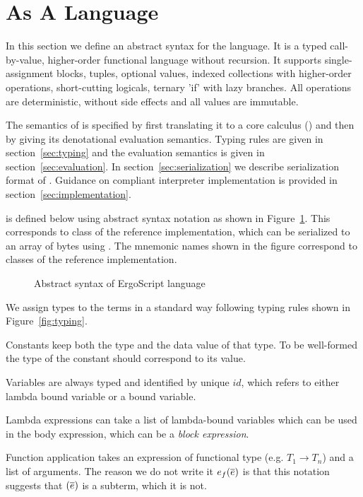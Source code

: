 \section{\langname As A Language}
\label{sec:language}

In this section we define an abstract syntax for the \langname language. It is a typed
call-by-value, higher-order functional language without recursion. It supports
single-assignment blocks, tuples, optional values, indexed collections with
higher-order operations, short-cutting logicals, ternary 'if' with lazy branches. All
operations are deterministic, without side effects and all values are immutable.

The semantics of \langname is specified by first translating it to a core calculus
(\corelang) and then by giving its denotational evaluation semantics. Typing rules are
given in section~\ref{sec:typing} and the evaluation semantics is given in
section~\ref{sec:evaluation}. In section~\ref{sec:serialization} we describe serialization format of
\langname. Guidance on compliant interpreter implementation is provided in
section~\ref{sec:implementation}.

\langname is defined below using abstract syntax notation as shown in
Figure~\ref{fig:language}. This corresponds to  class of the reference
implementation, which can be serialized to an array of bytes using
. The mnemonic names shown in the figure correspond to classes of
the reference implementation.

\begin{figure}[h]
    \footnotesize
    
    \caption{Abstract syntax of ErgoScript language}
    \label{fig:language}
\end{figure}
    
We assign types to the terms in a standard way following typing rules shown
in Figure~\ref{fig:typing}.

Constants keep both the type and the data value of that type. To be
well-formed the type of the constant should correspond to its value.

Variables are always typed and identified by unique $id$, which refers to
either lambda bound variable or a  bound variable. 

Lambda expressions can take a list of lambda-bound variables which can be
used in the body expression, which can be a \emph{block expression}. 

Function application takes an expression of functional type (e.g. $T_1 \to
T_n$) and a list of arguments. The reason we do not write it $e_f(\overline{e})$
is that this notation suggests that $(\overline{e})$ is a subterm, which it is not.

